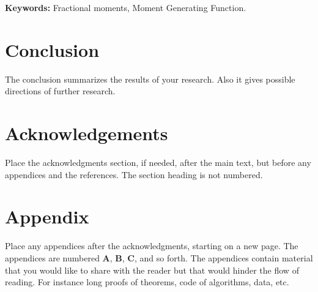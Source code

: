 \documentclass[a4paper,11pt]{article}
\theoremstyle{plain}
\numberwithin{theorem}{subsection}
\numberwithin{corollary}{subsection}
\numberwithin{proposition}{subsection}
\numberwithin{lemma}{subsection}
\numberwithin{assumption}{subsection}
\theoremstyle{definition}
\numberwithin{definition}{subsection}
\numberwithin{example}{subsection}
\numberwithin{remark}{subsection}
\numberwithin{notation}{subsection}
\begin{document}
\bigskip\noindent
\textbf{Keywords:} Fractional moments, Moment Generating Function.












\section{Conclusion}\label{s:con}
The conclusion summarizes the results of your research.
Also it gives possible directions of further research.

\section*{Acknowledgements}
Place the acknowledgments section, if needed, after the main text, 
but before any appendices and the references. The section heading is not numbered.

\newpage
\appendix


\section{Appendix}\label{s:app1}
Place any appendices after the acknowledgments, starting on a new page.
The appendices are numbered
\textbf{A}, \textbf{B}, \textbf{C}, and so forth.
The appendices contain material that you would like to share with the
reader but that would hinder the flow of reading. For instance long
proofs of theorems, code of algorithms, data, etc.




\end{document}

